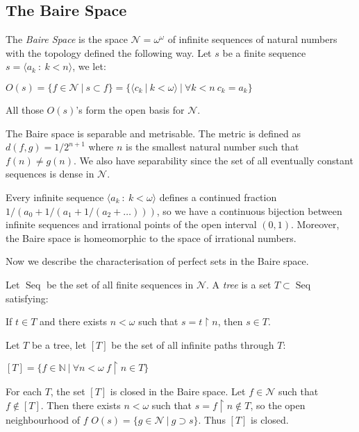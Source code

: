 \documentclass[8pt]{article}
\theoremstyle{definition}
\theoremstyle{definition}
\theoremstyle{definition}
\theoremstyle{definition}
\theoremstyle{definition}
\theoremstyle{definition}
\theoremstyle{definition}
\theoremstyle{definition}
\theoremstyle{definition}
\theoremstyle{definition}
\theoremstyle{definition}
\theoremstyle{definition}
\theoremstyle{definition}
\theoremstyle{definition}
\theoremstyle{question}
\begin{document}
\subsection{The Baire Space}

The \emph{Baire Space} is the space $\mathcal{N} = \omega^{\omega}$ of infinite sequences of natural numbers
with the topology defined the following way.
Let $s$ be a finite sequence $s = \langle a_k \: : \: k < n \rangle$, we let:
\begin{center}
  $O(s) = \{ f \in \mathcal{N} \: | \: s \subset f \} = \{ \langle c_k \: | \: k < \omega \rangle \: | \: \forall k < n \: c_k = a_k \}$
\end{center}
All those $O(s)$'s form the open basis for $\mathcal{N}$.

The Baire space is separable and metrisable. The metric is defined as $d(f, g) = 1/2^{n + 1}$ 
where $n$ is the smallest natural number such that $f(n) \neq g(n)$. 
We also have separability since the set of all eventually constant sequences is dense in $\mathcal{N}$.

Every infinite sequence $\langle a_k \: : \: k < \omega \rangle$ defines a continued fraction $1/(a_0 + 1/(a_1 + 1/(a_2 + \dots)))$,
so we have a continuous bijection between infinite sequences and irrational points of the open interval $(0, 1)$. 
Moreover, the Baire space is homeomorphic to the space of irrational numbers.

Now we describe the characterisation of perfect sets in the Baire space.

Let $\operatorname{Seq}$ be the set of all finite sequences in $\mathcal{N}$. 
A \emph{tree} is a set $T \subset \operatorname{Seq}$ satisfying:
\begin{center}
  If $t \in T$ and there exists $n < \omega$ such that $s = t \upharpoonright n$, then $s \in T$.
\end{center}

Let $T$ be a tree, let $[T]$ be the set of all infinite paths through $T$:
\begin{center}
  $[T] = \{ f \in \mathbb{N} \: | \: \forall n < \omega \: f \upharpoonright n \in T \}$
\end{center}

For each $T$, the set $[T]$ is closed in the Baire space. Let $f \in \mathcal{N}$
such that $f \notin [T]$. Then there exists $n < \omega$ such that $s = f \upharpoonright n \notin T$, 
so the open neighbourhood of $f$ $O(s) = \{ g \in \mathcal{N} \: | \: g \supset s \}$. Thus $[T]$ is closed.
\end{document}
